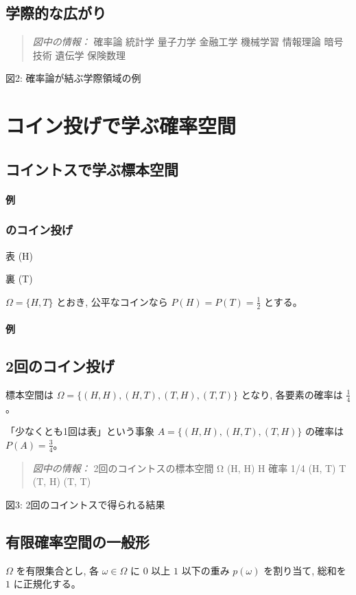 \documentclass[uplatex,dvipdfmx,11pt,a4paper,openany]{bxjsbook}
\newenvironment{figuretext}{\begin{quote}\small\color{black!65}\emph{図中の情報：}}{\end{quote}}
\begin{document}
\subsection{学際的な広がり}
\begin{figuretext}
確率論 \quad 統計学 \quad 量子力学 \quad 金融工学 \quad 機械学習 \quad 情報理論 \quad 暗号技術 \quad 遺伝学 \quad 保険数理
\end{figuretext}

図2: 確率論が結ぶ学際領域の例

\section{コイン投げで学ぶ確率空間}
\subsection{コイントスで学ぶ標本空間}
\paragraph{例}
\subsubsection{のコイン投げ}
表 (H)

裏 (T)

$\Omega = \{H, T\}$ とおき, 公平なコインなら $P(H) = P(T) = \tfrac{1}{2}$ とする。


\paragraph{例}
\subsection{2回のコイン投げ}
標本空間は $\Omega = \{(H,H), (H,T), (T,H), (T,T)\}$ となり, 各要素の確率は $\tfrac{1}{4}$。

「少なくとも1回は表」という事象 $A = \{(H,H), (H,T), (T,H)\}$ の確率は $P(A) = \tfrac{3}{4}$。


\begin{figuretext}
2回のコイントスの標本空間 Ω \quad (H, H) \quad H \quad 確率 1/4 \quad (H, T) \quad T \quad (T, H) \quad (T, T)
\end{figuretext}

図3: 2回のコイントスで得られる結果

\subsection{有限確率空間の一般形}
$\Omega$ を有限集合とし, 各 $\omega \in \Omega$ に $0$ 以上 $1$ 以下の重み $p(\omega)$ を割り当て, 総和を $1$ に正規化する。
\end{document}
